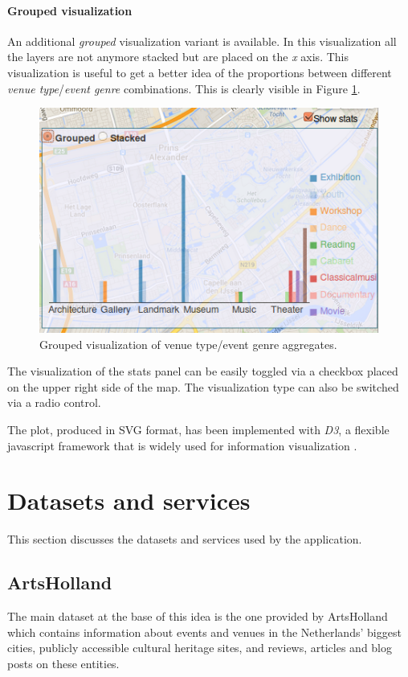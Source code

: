 \documentclass[hidelinks,a4paper]{article}
\begin{document}
\paragraph{Grouped visualization}
An additional \emph{grouped} visualization variant is available.
In this visualization all the layers are not anymore stacked but are placed
on the \emph{x} axis. This visualization is useful
to get a better idea of the proportions between different
\emph{venue type}/\emph{event genre} combinations.
This is clearly visible in Figure \ref{fig:stats_grouped}.

\begin{figure}[h!]
  \centering
    \includegraphics[scale=0.48]{images/stats_grouped.png}    
    \caption{Grouped visualization of venue type/event genre aggregates.}
    \label{fig:stats_grouped}
\end{figure}


The visualization of the stats panel can be easily toggled
via a checkbox placed on the upper right side of the map.
The visualization type can also be switched via a radio control.

The plot, produced in SVG format,
has been implemented with \emph{D3},
a flexible javascript framework that is widely
used for information visualization \cite{d3}.

\section{Datasets and services}\label{data_services}
This section discusses the datasets and services used by the application.

\subsection{ArtsHolland}
The main dataset at the base of this idea is the one provided by ArtsHolland \cite{artsholland} which contains information about events and venues in the Netherlands' biggest cities, publicly accessible cultural heritage sites, and reviews, articles and blog posts on these entities.
\end{document}
